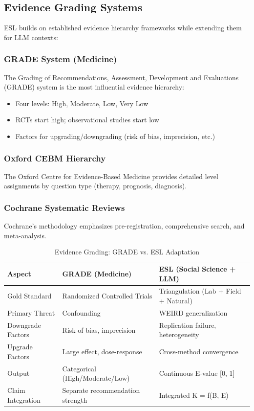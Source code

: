 \documentclass[11pt,a4paper]{article}
\begin{document}
\subsection{Evidence Grading Systems}

ESL builds on established evidence hierarchy frameworks while extending them for LLM contexts:

\subsubsection{GRADE System (Medicine)}

The Grading of Recommendations, Assessment, Development and Evaluations (GRADE) system \citep{GRADE2004} is the most influential evidence hierarchy:
\begin{itemize}
    \item Four levels: High, Moderate, Low, Very Low
    \item RCTs start high; observational studies start low
    \item Factors for upgrading/downgrading (risk of bias, imprecision, etc.)
\end{itemize}

\subsubsection{Oxford CEBM Hierarchy}

The Oxford Centre for Evidence-Based Medicine \citep{OxfordCEBM2011} provides detailed level assignments by question type (therapy, prognosis, diagnosis).

\subsubsection{Cochrane Systematic Reviews}

Cochrane's methodology emphasizes pre-registration, comprehensive search, and meta-analysis.

\begin{table}[h]
\centering
\caption{Evidence Grading: GRADE vs. ESL Adaptation}
\label{tab:grade-esl}
\begin{tabular}{p{4cm}p{5cm}p{5cm}}
\toprule
\textbf{Aspect} & \textbf{GRADE (Medicine)} & \textbf{ESL (Social Science + LLM)} \\
\midrule
Gold Standard & Randomized Controlled Trials & Triangulation (Lab + Field + Natural) \\
Primary Threat & Confounding & WEIRD generalization \\
Downgrade Factors & Risk of bias, imprecision & Replication failure, heterogeneity \\
Upgrade Factors & Large effect, dose-response & Cross-method convergence \\
Output & Categorical (High/Moderate/Low) & Continuous E-value [0, 1] \\
Claim Integration & Separate recommendation strength & Integrated K = f(B, E) \\
\bottomrule
\end{tabular}
\end{table}
\end{document}
